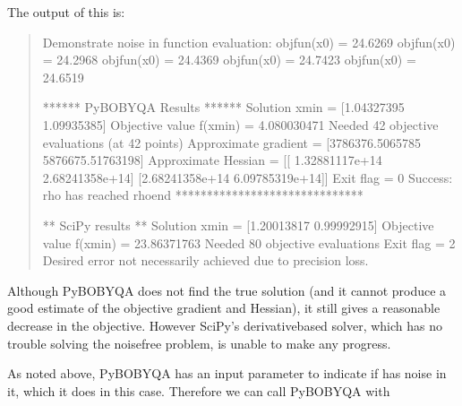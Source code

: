 \documentclass[letterpaper,10pt,english]{sphinxmanual}
\begin{document}
The output of this is:
\begin{quote}

\begin{sphinxVerbatim}[commandchars=\\\{\}]
Demonstrate noise in function evaluation:
objfun(x0) = 24.6269
objfun(x0) = 24.2968
objfun(x0) = 24.4369
objfun(x0) = 24.7423
objfun(x0) = 24.6519

****** Py\PYGZhy{}BOBYQA Results ******
Solution xmin = [\PYGZhy{}1.04327395  1.09935385]
Objective value f(xmin) = 4.080030471
Needed 42 objective evaluations (at 42 points)
Approximate gradient = [\PYGZhy{}3786376.5065785   5876675.51763198]
Approximate Hessian = [[ 1.32881117e+14 \PYGZhy{}2.68241358e+14]
 [\PYGZhy{}2.68241358e+14  6.09785319e+14]]
Exit flag = 0
Success: rho has reached rhoend
******************************


** SciPy results **
Solution xmin = [\PYGZhy{}1.20013817  0.99992915]
Objective value f(xmin) = 23.86371763
Needed 80 objective evaluations
Exit flag = 2
Desired error not necessarily achieved due to precision loss.
\end{sphinxVerbatim}
\end{quote}

Although Py\sphinxhyphen{}BOBYQA does not find the true solution (and it cannot produce a good estimate of the objective gradient and Hessian), it still gives a reasonable decrease in the objective. However SciPy’s derivative\sphinxhyphen{}based solver, which has no trouble solving the noise\sphinxhyphen{}free problem, is unable to make any progress.

As noted above, Py\sphinxhyphen{}BOBYQA has an input parameter  to indicate if  has noise in it, which it does in this case. Therefore we can call Py\sphinxhyphen{}BOBYQA with
\begin{quote}

\begin{sphinxVerbatim}[commandchars=\\\{\}]
    
\end{sphinxVerbatim}
\end{quote}
\end{document}
